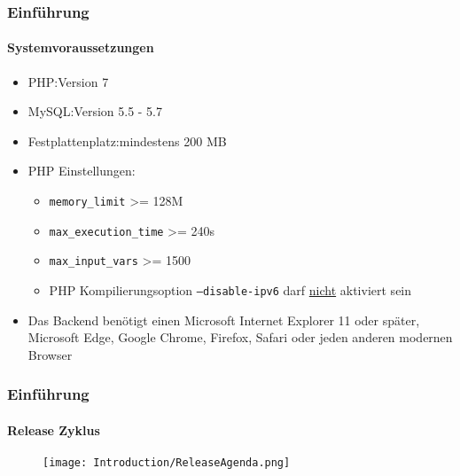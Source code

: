 \begin{frame}[fragile]
	\frametitle{Einführung}
	\framesubtitle{Systemvoraussetzungen}

	\begin{itemize}
		\item PHP:\tabto{3cm}Version 7
		\item MySQL:\tabto{3cm}Version 5.5 - 5.7
		\item Festplattenplatz:\tabto{3cm}mindestens 200 MB
		\item PHP Einstellungen:

			\begin{itemize}
				\item \texttt{memory\_limit} >= 128M
				\item \texttt{max\_execution\_time} >= 240s
				\item \texttt{max\_input\_vars} >= 1500
				\item PHP Kompilierungsoption \texttt{--disable-ipv6} darf \underline{nicht} aktiviert sein
			\end{itemize}

		\item Das Backend benötigt einen Microsoft Internet Explorer 11 oder später,
			Microsoft Edge, Google Chrome, Firefox, Safari oder jeden anderen modernen Browser

	\end{itemize}

\end{frame}

\begin{frame}[fragile]
	\frametitle{Einführung}
	\framesubtitle{Release Zyklus}

	\begin{figure}
		\texttt{[image: Introduction/ReleaseAgenda.png]}
	\end{figure}

\end{frame}

